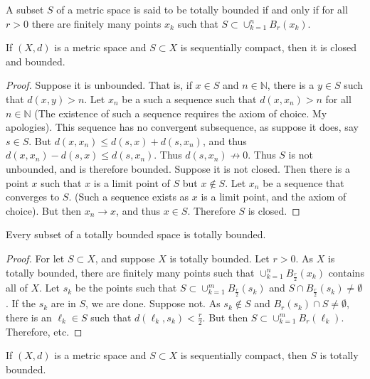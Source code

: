 \documentclass[crop=false,class=book,oneside]{standalone}
\begin{document}
            \begin{definition}
            A subset $S$ of a metric space is said to be totally bounded if and only if for all $r>0$ there are finitely many points $x_k$ such that $S\subset \cup_{k=1}^{n} B_{r}(x_k)$.
            \end{definition}
            \begin{theorem}
            If $(X,d)$ is a metric space and $S\subset X$ is sequentially compact, then it is closed and bounded.
            \end{theorem}
            \begin{proof}
            \item Suppose it is unbounded. That is, if $x\in S$ and $n\in \mathbb{N}$, there is a $y\in S$ such that $d(x,y)>n$. Let $x_n$ be a such a sequence such that $d(x,x_n)>n$ for all $n\in \mathbb{N}$ (The existence of such a sequence requires the axiom of choice. My apologies). This sequence has no convergent subsequence, as suppose it does, say $s\in S$. But $d(x,x_n) \leq d(s,x)+d(s,x_n)$, and thus $d(x,x_n)-d(s,x)\leq d(s,x_n)$. Thus $d(s,x_n) \not\rightarrow 0$. Thus $S$ is not unbounded, and is therefore bounded. Suppose it is not closed. Then there is a point $x$ such that $x$ is a limit point of $S$ but $x\notin S$. Let $x_n$ be a sequence that converges to $S$. (Such a sequence exists as $x$ is a limit point, and the axiom of choice). But then $x_n \rightarrow x$, and thus $x\in S$. Therefore $S$ is closed.
            \end{proof}
            \begin{theorem}
            Every subset of a totally bounded space is totally bounded.
            \end{theorem}
            \begin{proof}
            For let $S\subset X$, and suppose $X$ is totally bounded. Let $r>0$. As $X$ is totally bounded, there are finitely many points such that $\cup_{k=1}^{n} B_{\frac{r}{2}}(x_k)$ contains all of $X$. Let $s_k$ be the points such that $S\subset \cup_{k=1}^{m} B_{\frac{r}{2}}(s_k)$ and $S\cap B_{\frac{r}{2}}(s_k) \ne \emptyset$. If the $s_k$ are in $S$, we are done. Suppose not. As $s_k \notin S$ and $B_{r}(s_k)\cap S \ne \emptyset$, there is an $\ell_k \in S$ such that $d(\ell_k,s_k)< \frac{r}{2}$. But then $S\subset \cup_{k=1}^{m} B_{r}(\ell_k)$. Therefore, etc.
            \end{proof}
            \begin{theorem}
            If $(X,d)$ is a metric space and $S\subset X$ is sequentially compact, then $S$ is totally bounded.
            \end{theorem}
\end{document}
